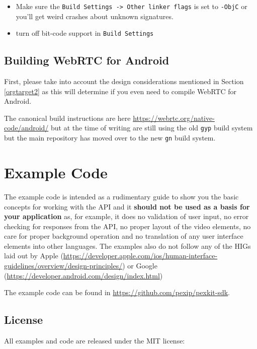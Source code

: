 \documentclass[a4paper,11pt]{article}
\begin{document}
\begin{itemize}
\item Make sure the \texttt{Build Settings -> Other linker flags} is set to
\texttt{-ObjC} or you’ll get weird crashes about unknown signatures.
\item turn off bit-code support in \texttt{Build Settings}
\end{itemize}

\subsection{Building WebRTC for Android}
\label{sec:orgheadline50}

\label{orgtarget9}

First, please take into account the design considerations mentioned in
Section \ref{orgtarget2} as this will determine if you
even need to compile WebRTC for Android.

The canonical build instructions are here
\url{https://webrtc.org/native-code/android/} but at the time of writing are
still using the old \texttt{gyp} build system but the main repository has
moved over to the new \texttt{gn} build system.


\section{Example Code}
\label{sec:orgheadline71}
\label{orgtarget6}

The example code is intended as a rudimentary guide to show you the
basic concepts for working with the API and it \textbf{should not be used as
a basis for your application} as, for example, it does no validation
of user input, no error checking for responses from the API, no proper
layout of the video elements, no care for proper background operation
and no translation of any user interface elements into other
languages.  The examples also do not follow any of the HIGs laid out
by Apple
(\url{https://developer.apple.com/ios/human-interface-guidelines/overview/design-principles/})
or Google (\url{https://developer.android.com/design/index.html})

The example code can be found in \url{https://github.com/pexip/pexkit-sdk}.

\subsection{License}
\label{sec:orgheadline52}

All examples and code are released under the MIT license:
\end{document}
